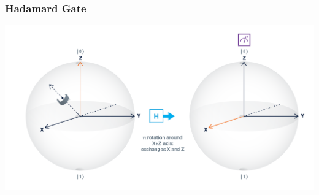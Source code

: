 \documentclass[aspectratio=169,11pt,hyperref={colorlinks=true}]{beamer}
\begin{document}
\begin{frame}
    \frametitle{Hadamard Gate}
    \centering
    \includegraphics[width=\textwidth]{gate_h_bloch.png}
\end{frame}
\end{document}
